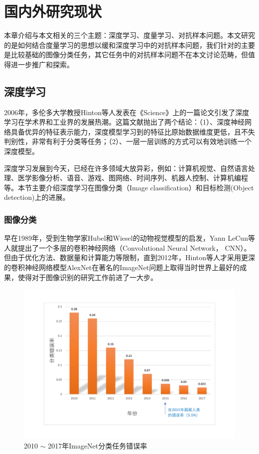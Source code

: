 \chapter{国内外研究现状}

本章介绍与本文相关的三个主题：深度学习、度量学习、对抗样本问题。本文研究的是如何结合度量学习的思想以缓和深度学习中的对抗样本问题，我们针对的主要是比较基础的图像分类任务，其它任务中的对抗样本问题不在本文讨论范畴，但值得进一步推广和探索。

\section{深度学习}

2006年，多伦多大学教授Hinton等人发表在《Science》上的一篇论文引发了深度学习在学术界和工业界的发展热潮\cite{hinton2006reducing}。这篇文献抛出了两个结论：（1）、深度神经网络具备优异的特征表示能力，深度模型学习到的特征比原始数据维度更低，且不失判别性，非常有利于分类等任务；（2）、一层一层训练的方式可以有效地训练一个深度模型。

深度学习发展到今天，已经在许多领域大放异彩，例如：计算机视觉、自然语言处理、医学影像分析、语音、游戏、图网络、时间序列、机器人控制、计算机编程等。本节主要介绍深度学习在图像分类（Image classification）和目标检测(Object detection)上的进展。

\subsection{图像分类}

早在1989年，受到生物学家Hubel和Wiesel的动物视觉模型\cite{hubel1962receptive}的启发，Yann LeCun等人就提出了一个多层的卷积神经网络（Convolutional Neural Network， CNN）\cite{lecun1989backpropagation}。但由于优化方法、数据量和计算能力等限制，直到2012年，Hinton等人才采用更深的卷积神经网络模型AlexNet在著名的ImageNet问题上取得当时世界上最好的成果，使得对于图像识别的研究工作前进了一大步\cite{krizhevsky2012imagenet}。

\begin{figure}[h]
    \centering
    \includegraphics[width=15cm]{fig/imagenet.pdf}
    \caption{2010 $\sim$ 2017年ImageNet分类任务错误率}
    \label{fig:imagenet}
\end{figure}

